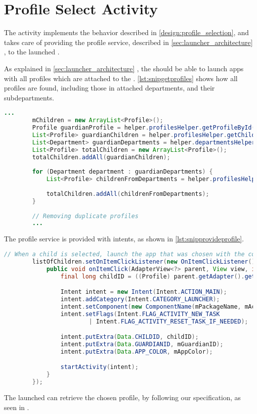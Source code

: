 \section{Profile Select Activity}

The  activity implements the behavior described in \autoref{design:profile_selection}, and takes care of providing the profile service, described in \autoref{sec:launcher_architecture} , to the launched \girafapp[].

As explained in \autoref{sec:launcher_architecture} , the \guardian[] should be able to launch apps with all profiles which are attached to the \guardian[]. \autoref{lst:snipgetprofiles} shows how all profiles are found, including those in attached departments, and their subdepartments.

\begin{lstlisting}[style=sourceCode, language=JAVA, caption=Snippet of the \method{loadApplications} method, label=lst:snipgetprofiles]
		...
		mChildren = new ArrayList<Profile>();
		Profile guardianProfile = helper.profilesHelper.getProfileById(mGuardianID);
		List<Profile> guardianChildren = helper.profilesHelper.getChildrenByGuardian(guardianProfile);
		List<Department> guardianDepartments = helper.departmentsHelper.getDepartmentsByProfile(guardianProfile);
		List<Profile> totalChildren = new ArrayList<Profile>();
		totalChildren.addAll(guardianChildren);
		
		for (Department department : guardianDepartments) {
			List<Profile> childrenFromDepartments = helper.profilesHelper.getChildrenByDepartmentAndSubDepartments(department);
			
			totalChildren.addAll(childrenFromDepartments);
		}
		
		// Removing duplicate profiles
		...
\end{lstlisting}

The profile service is provided with intents, as shown in \autoref{lst:snipprovideprofile}.

\begin{lstlisting}[style=sourceCode, language=JAVA, caption=Snippet of the \method{loadApplications} method, label=lst:snipprovideprofile]
		// When a child is selected, launch the app that was chosen with the correct data in the extras.
		listOfChildren.setOnItemClickListener(new OnItemClickListener() {
			public void onItemClick(AdapterView<?> parent, View view, int position, long id) {
				final long childID = ((Profile) parent.getAdapter().getItem(position)).getId();

				Intent intent = new Intent(Intent.ACTION_MAIN);
				intent.addCategory(Intent.CATEGORY_LAUNCHER);
				intent.setComponent(new ComponentName(mPackageName, mActivityName));
				intent.setFlags(Intent.FLAG_ACTIVITY_NEW_TASK
						| Intent.FLAG_ACTIVITY_RESET_TASK_IF_NEEDED);

				intent.putExtra(Data.CHILDID, childID);
				intent.putExtra(Data.GUARDIANID, mGuardianID);
				intent.putExtra(Data.APP_COLOR, mAppColor);

				startActivity(intent);
			}
		});
\end{lstlisting}

The launched \girafapp[] can retrieve the chosen profile, by following our specification, as seen in .